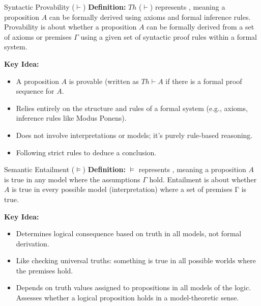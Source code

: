 \documentclass{beamer} %
\begin{document}
\begin{frame}{Syntactic Provability (\( \vdash \))}
    \textbf{Definition:}  
    \( Th \) (\( \vdash \)) represents , meaning a proposition $A$ can be formally derived using axioms and formal inference rules.  
    Provability is about whether a proposition $A$ can be formally derived from a set of axioms or premises \( \Gamma \) using a given set of syntactic proof rules within a formal system.

    \textbf{Key Idea:} 
    \begin{itemize}
        \item A proposition $A$ is provable (written as $Th \vdash A$ if there is a formal proof sequence for $A$.
        \item Relies entirely on the structure and rules of a formal system (e.g., axioms, inference rules like Modus Ponens).
        \item Does not involve interpretations or models; it’s purely rule-based reasoning.
        \item Following strict rules to deduce a conclusion.

    \end{itemize}                 

\end{frame}

\begin{frame}{Semantic Entailment (\( \vDash \))}
    \textbf{Definition:}  
    \( \vDash \) represents , meaning a proposition $A$ is true in any model where the assumptions \( \Gamma \) hold.  Entailment is about whether $A$ is true in every possible model (interpretation) where a set of premises Γ is true.

    
    \textbf{Key Idea:} 
    \begin{itemize}
        \item Determines logical consequence based on truth in all models, not formal derivation.
        \item Like checking universal truths: something is true in all possible worlds where the premises hold.
        \item Depends on truth values assigned to propositions in all models of the logic.
        Assesses whether a logical proposition holds in a model-theoretic sense.    
    \end{itemize}  

\end{frame}
\end{document}
